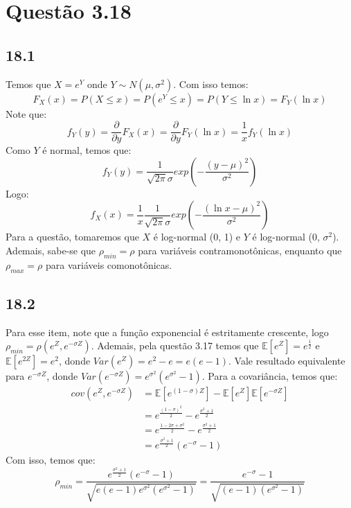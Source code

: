 \documentclass[12pt]{article}
\begin{document}
\section*{Questão 3.18}

\subsection*{18.1}
Temos que $X=e^Y$ onde $Y\sim N(\mu, \sigma^2)$. Com isso temos:
\begin{equation*}
F_{X}(x)=P(X\leq x)= P(e^Y\leq x) = P(Y \leq \ln x)=F_{Y}(\ln x)
\end{equation*}
Note que:
\begin{equation*}
f_{Y}(y)=\frac{\partial }{\partial y}F_{X}(x)=\frac{\partial }{\partial y}F_{Y}(\ln x)=
\frac{1}{x}f_{Y}(\ln x)
\end{equation*}
Como $Y$ é normal, temos que:
\begin{equation*}
f_{Y}(y)=\frac{1}{\sqrt{2\pi}\sigma}exp\left(-\frac{(y-\mu)^2}{\sigma^2}\right)
\end{equation*}
Logo:
\begin{equation*}
f_{X}(x)=\frac{1}{x}\frac{1}{\sqrt{2\pi}\sigma}exp\left(-\frac{(\ln x-\mu)^2}{\sigma^2}\right)
\end{equation*}
Para a questão, tomaremos que $X$ é log-normal (0, 1) e $Y$ é log-normal (0, $\sigma^2$). Ademais, sabe-se que $\rho_{min}=\rho$ para variáveis contramonotônicas, enquanto que $\rho_{max}=\rho$ para variáveis comonotônicas.

\subsection*{18.2}
Para esse item, note que a função exponencial é estritamente crescente, logo $\rho_{min}=\rho(e^Z,e^{-\sigma Z})$. Ademais, pela questão 3.17 temos que $\mathbb{E}[e^Z]=e^{\frac{1}{2}}$ e $\mathbb{E}[e^{2Z}]=e^2$, donde $Var(e^Z)=e^2-e=e(e-1)$. Vale resultado equivalente para $e^{-\sigma Z}$, donde $Var(e^{-\sigma Z})=e^{\sigma^2}(e^{\sigma^2}-1)$. Para a covariância, temos que:
\begin{align*}
cov(e^Z, e^{-\sigma Z})&=\mathbb{E}[e^{(1-\sigma)Z}] - \mathbb{E}[e^Z]\mathbb{E}[e^{-\sigma Z}]\\
&=e^{\frac{(1-\sigma)^2}{2}}-e^{\frac{\sigma^2+1}{2}}\\
&=e^{\frac{1-2\sigma +\sigma^2}{2}}-e^{\frac{\sigma^2+1}{2}}\\
&=e^{\frac{\sigma^2+1}{2}}(e^{-\sigma}-1)
\end{align*}
Com isso, temos que:
\begin{equation*}
\rho_{min}=\frac{e^{\frac{\sigma^2+1}{2}}(e^{-\sigma}-1)}
{\sqrt{e(e-1)e^{\sigma^2}(e^{\sigma^2}-1)}}=
\frac{e^{-\sigma}-1}
{\sqrt{(e-1)(e^{\sigma^2}-1)}}
\end{equation*}
\end{document}

